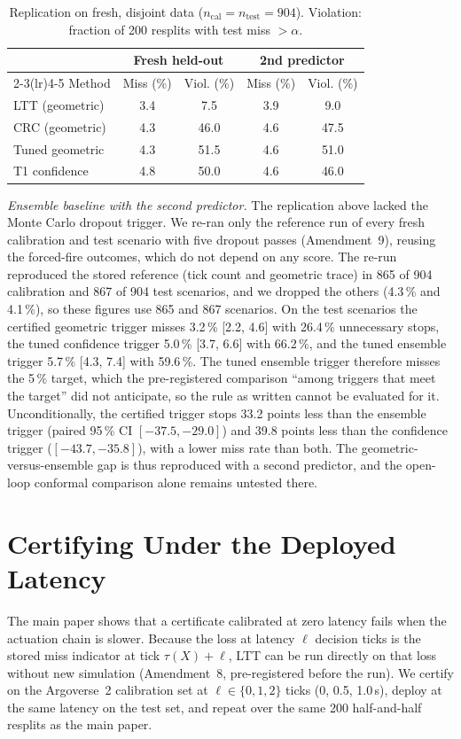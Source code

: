 \documentclass[lettersize,journal]{IEEEtran}
\begin{document}
\begin{table}[h]
\caption{Replication on fresh, disjoint data ($n_{\mathrm{cal}} =
n_{\mathrm{test}} = 904$). Violation: fraction of 200 resplits with test
miss $>\alpha$.}
\label{tab:replicate}
\centering
\scriptsize\setlength{\tabcolsep}{3pt}
\begin{tabular}{lcccc}
\toprule
& \multicolumn{2}{c}{Fresh held-out} & \multicolumn{2}{c}{2nd predictor} \\
\cmidrule(lr){2-3}\cmidrule(lr){4-5}
Method & Miss (\%) & Viol. (\%) & Miss (\%) & Viol. (\%) \\
\midrule
LTT (geometric) & 3.4 & 7.5 & 3.9 & 9.0 \\
CRC (geometric) & 4.3 & 46.0 & 4.6 & 47.5 \\
Tuned geometric & 4.3 & 51.5 & 4.6 & 51.0 \\
T1 confidence & 4.8 & 50.0 & 4.6 & 46.0 \\
\bottomrule
\end{tabular}
\end{table}

\emph{Ensemble baseline with the second predictor.} The replication above
lacked the Monte Carlo dropout trigger. We re-ran only the reference run
of every fresh calibration and test scenario with five dropout passes
(Amendment~9), reusing the forced-fire outcomes, which do not depend on
any score. The re-run reproduced the stored reference (tick count and
geometric trace) in 865 of 904 calibration and 867 of 904 test scenarios,
and we dropped the others (4.3\,\% and 4.1\,\%), so these figures use 865
and 867 scenarios. On the test scenarios the certified geometric trigger
misses 3.2\,\% [2.2, 4.6] with 26.4\,\% unnecessary stops, the tuned
confidence trigger 5.0\,\% [3.7, 6.6] with 66.2\,\%, and the tuned ensemble
trigger 5.7\,\% [4.3, 7.4] with 59.6\,\%. The tuned ensemble trigger
therefore misses the 5\,\% target, which the pre-registered comparison
``among triggers that meet the target'' did not anticipate, so the rule
as written cannot be evaluated for it. Unconditionally, the certified
trigger stops 33.2 points less than the ensemble trigger (paired 95\,\%
CI $[-37.5, -29.0]$) and 39.8 points less than the confidence trigger
($[-43.7, -35.8]$), with a lower miss rate than both. The
geometric-versus-ensemble gap is thus reproduced with a second predictor,
and the open-loop conformal comparison alone remains untested there.


\section{Certifying Under the Deployed Latency}
\label{sec:s-latency}
The main paper shows that a certificate calibrated at zero latency fails
when the actuation chain is slower. Because the loss at latency $\ell$
decision ticks is the stored miss indicator at tick $\tau(X)+\ell$, LTT can
be run directly on that loss without new simulation (Amendment~8,
pre-registered before the run). We certify on the Argoverse~2 calibration
set at $\ell \in \{0,1,2\}$ ticks (0, 0.5, 1.0\,s), deploy at the same
latency on the test set, and repeat over the same 200 half-and-half
resplits as the main paper.
\end{document}

